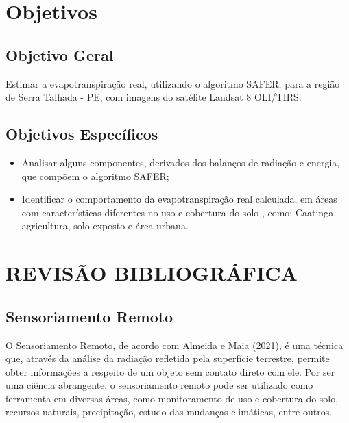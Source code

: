 \documentclass[fleqn]{icat-ufal}
\begin{document}
\chapter{Objetivos}
\label{cap:Objetivos}

\section{Objetivo Geral}
\label{sec:Objetivo Geral}

Estimar a evapotranspiração real, utilizando o algoritmo SAFER, para a região  de Serra Talhada - PE, com imagens do satélite Landsat 8 OLI/TIRS.

\section{Objetivos Específicos}
\label{sec:Objetivos Específicos}
\begin{itemize}
    \item  Analisar alguns componentes, derivados dos balanços de radiação e energia, que compõem o algoritmo SAFER;
    \item Identificar o comportamento da evapotranspiração real calculada, em áreas com características diferentes no uso e cobertura do solo , como: Caatinga, agricultura, solo exposto e área urbana.
\end{itemize}

\chapter{REVISÃO BIBLIOGRÁFICA}
\label{cap:REVISÃO BIBLIOGRÁFICA}

\section{Sensoriamento Remoto}
\label{sec:Sensoriamento Remoto}

O Sensoriamento Remoto, de acordo com Almeida e Maia (2021), é uma técnica que, através da análise da radiação refletida pela superfície terrestre, permite obter informações a respeito de um objeto sem contato direto com ele. Por ser uma ciência abrangente, o sensoriamento remoto pode ser utilizado como ferramenta em diversas áreas, como monitoramento de uso e cobertura do solo, recursos naturais, precipitação, estudo das mudanças climáticas, entre outros.
\end{document}

